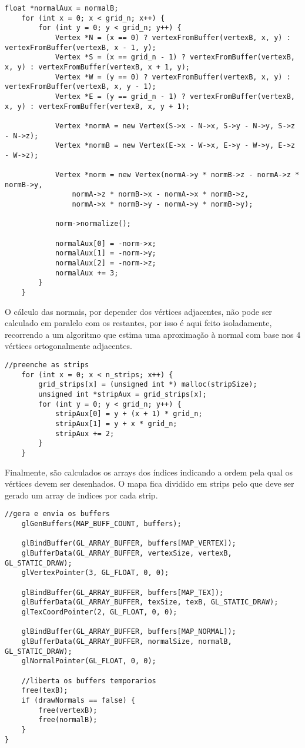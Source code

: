 \begin{lstlisting}[caption=Cálculo dos buffers para VBOs (normais)]
	float *normalAux = normalB;
	for (int x = 0; x < grid_n; x++) {
		for (int y = 0; y < grid_n; y++) {
			Vertex *N = (x == 0) ? vertexFromBuffer(vertexB, x, y) : vertexFromBuffer(vertexB, x - 1, y);
			Vertex *S = (x == grid_n - 1) ? vertexFromBuffer(vertexB, x, y) : vertexFromBuffer(vertexB, x + 1, y);
			Vertex *W = (y == 0) ? vertexFromBuffer(vertexB, x, y) : vertexFromBuffer(vertexB, x, y - 1);
			Vertex *E = (y == grid_n - 1) ? vertexFromBuffer(vertexB, x, y) : vertexFromBuffer(vertexB, x, y + 1);

			Vertex *normA = new Vertex(S->x - N->x, S->y - N->y, S->z - N->z);
			Vertex *normB = new Vertex(E->x - W->x, E->y - W->y, E->z - W->z);

			Vertex *norm = new Vertex(normA->y * normB->z - normA->z * normB->y,
				normA->z * normB->x - normA->x * normB->z,
				normA->x * normB->y - normA->y * normB->y);

			norm->normalize();

			normalAux[0] = -norm->x;
			normalAux[1] = -norm->y;
			normalAux[2] = -norm->z;
			normalAux += 3;
		}
	}
\end{lstlisting}
O cálculo das normais, por depender dos vértices adjacentes, não pode ser calculado em paralelo com os restantes, por isso é aqui feito isoladamente, recorrendo a um algoritmo que estima uma aproximação à normal com base nos 4 vértices ortogonalmente adjacentes.

\begin{lstlisting}[caption=Cálculo dos buffers para VBOs (índices)]
	//preenche as strips
	for (int x = 0; x < n_strips; x++) {
		grid_strips[x] = (unsigned int *) malloc(stripSize);
		unsigned int *stripAux = grid_strips[x];
		for (int y = 0; y < grid_n; y++) {
			stripAux[0] = y + (x + 1) * grid_n;
			stripAux[1] = y + x * grid_n;
			stripAux += 2;
		}
	}
\end{lstlisting}

Finalmente, são calculados os arrays dos índices indicando a ordem pela qual os vértices devem ser desenhados. O mapa fica dividido em strips pelo que deve ser gerado um array de indices por cada strip.

\begin{lstlisting}[caption=Cálculo dos buffers para VBOs (envio dos buffers)]
	//gera e envia os buffers
	glGenBuffers(MAP_BUFF_COUNT, buffers);

	glBindBuffer(GL_ARRAY_BUFFER, buffers[MAP_VERTEX]);
	glBufferData(GL_ARRAY_BUFFER, vertexSize, vertexB, GL_STATIC_DRAW);
	glVertexPointer(3, GL_FLOAT, 0, 0);

	glBindBuffer(GL_ARRAY_BUFFER, buffers[MAP_TEX]);
	glBufferData(GL_ARRAY_BUFFER, texSize, texB, GL_STATIC_DRAW);
	glTexCoordPointer(2, GL_FLOAT, 0, 0);

	glBindBuffer(GL_ARRAY_BUFFER, buffers[MAP_NORMAL]);
	glBufferData(GL_ARRAY_BUFFER, normalSize, normalB, GL_STATIC_DRAW);
	glNormalPointer(GL_FLOAT, 0, 0);

	//liberta os buffers temporarios
	free(texB);
	if (drawNormals == false) {
		free(vertexB);
		free(normalB);
	}
}
\end{lstlisting}

